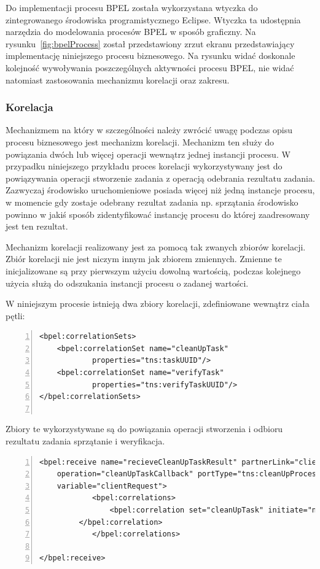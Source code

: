 Do implementacji procesu BPEL została wykorzystana wtyczka do zintegrowanego środowiska programistycznego Eclipse. Wtyczka ta udostępnia narzędzia do modelowania procesów BPEL w sposób graficzny. Na rysunku~\ref{fig:bpelProcess} został przedstawiony zrzut ekranu przedstawiający implementację niniejszego procesu biznesowego. Na rysunku widać doskonale kolejność wywoływania poszczególnych aktywności procesu BPEL, nie widać natomiast zastosowania mechanizmu korelacji oraz zakresu. 

\subsubsection{Korelacja}

Mechanizmem na który w szczególności należy zwrócić uwagę podczas opisu procesu biznesowego jest mechanizm korelacji. Mechanizm ten służy do powiązania dwóch lub więcej operacji wewnątrz jednej instancji procesu. W przypadku niniejszego przykładu proces korelacji wykorzystywany jest do powiązywania operacji stworzenie zadania z operacją odebrania rezultatu zadania. Zazwyczaj środowisko uruchomieniowe posiada więcej niż jedną instancje procesu, w momencie gdy zostaje odebrany rezultat zadania np. sprzątania środowisko powinno w jakiś sposób zidentyfikować instancję procesu do której zaadresowany jest ten rezultat. 

Mechanizm korelacji realizowany jest za pomocą tak zwanych zbiorów korelacji. Zbiór korelacji nie jest niczym innym jak zbiorem zmiennych. Zmienne te inicjalizowane są przy pierwszym użyciu dowolną wartością, podczas kolejnego użycia służą do odszukania instancji procesu o zadanej wartości. 

W niniejszym procesie istnieją dwa zbiory korelacji, zdefiniowane wewnątrz ciała pętli: 

\begin{lstlisting}[caption=Definicja zbiorów korelacji.,numbers=left]
<bpel:correlationSets>
	<bpel:correlationSet name="cleanUpTask" 
			properties="tns:taskUUID"/>
	<bpel:correlationSet name="verifyTask" 
			properties="tns:verifyTaskUUID"/>
</bpel:correlationSets> 


\end{lstlisting}

Zbiory te wykorzystywane są do powiązania operacji stworzenia i odbioru rezultatu zadania sprzątanie i weryfikacja. 

\begin{lstlisting}[caption=Wykorzystanie zbiorów korelacji w aktywności invoke.,numbers=left]
<bpel:receive name="recieveCleanUpTaskResult" partnerLink="client" 
	operation="cleanUpTaskCallback" portType="tns:cleanUpProcess" 
	variable="clientRequest">
            <bpel:correlations>
                <bpel:correlation set="cleanUpTask" initiate="no">
	     </bpel:correlation>    
            </bpel:correlations>
        
</bpel:receive>
\end{lstlisting}

